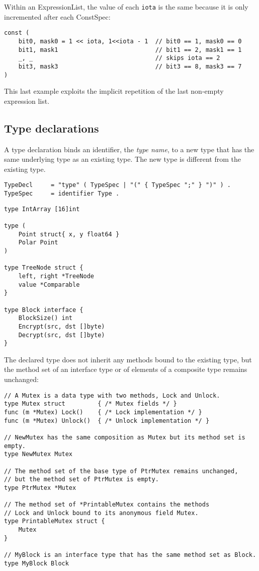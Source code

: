Within an ExpressionList, the value of each \texttt{iota} is the same
because it is only incremented after each ConstSpec:

\begin{Verbatim}[frame=single]
const (
    bit0, mask0 = 1 << iota, 1<<iota - 1  // bit0 == 1, mask0 == 0
    bit1, mask1                           // bit1 == 2, mask1 == 1
    _, _                                  // skips iota == 2
    bit3, mask3                           // bit3 == 8, mask3 == 7
)
\end{Verbatim}

This last example exploits the implicit repetition of the last non-empty
expression list.

\subsection*{Type declarations}

A type declaration binds an identifier, the \emph{type name}, to a new
type that has the same underlying type as an existing
type. The new type is different from the
existing type.

\begin{Verbatim}[frame=single]
TypeDecl     = "type" ( TypeSpec | "(" { TypeSpec ";" } ")" ) .
TypeSpec     = identifier Type .
\end{Verbatim}

\begin{Verbatim}[frame=single]
type IntArray [16]int

type (
    Point struct{ x, y float64 }
    Polar Point
)

type TreeNode struct {
    left, right *TreeNode
    value *Comparable
}

type Block interface {
    BlockSize() int
    Encrypt(src, dst []byte)
    Decrypt(src, dst []byte)
}
\end{Verbatim}

The declared type does not inherit any
methods bound to the existing type, but
the method set of an interface type or of
elements of a composite type remains unchanged:

\begin{Verbatim}[frame=single]
// A Mutex is a data type with two methods, Lock and Unlock.
type Mutex struct         { /* Mutex fields */ }
func (m *Mutex) Lock()    { /* Lock implementation */ }
func (m *Mutex) Unlock()  { /* Unlock implementation */ }

// NewMutex has the same composition as Mutex but its method set is empty.
type NewMutex Mutex

// The method set of the base type of PtrMutex remains unchanged,
// but the method set of PtrMutex is empty.
type PtrMutex *Mutex

// The method set of *PrintableMutex contains the methods
// Lock and Unlock bound to its anonymous field Mutex.
type PrintableMutex struct {
    Mutex
}

// MyBlock is an interface type that has the same method set as Block.
type MyBlock Block
\end{Verbatim}

